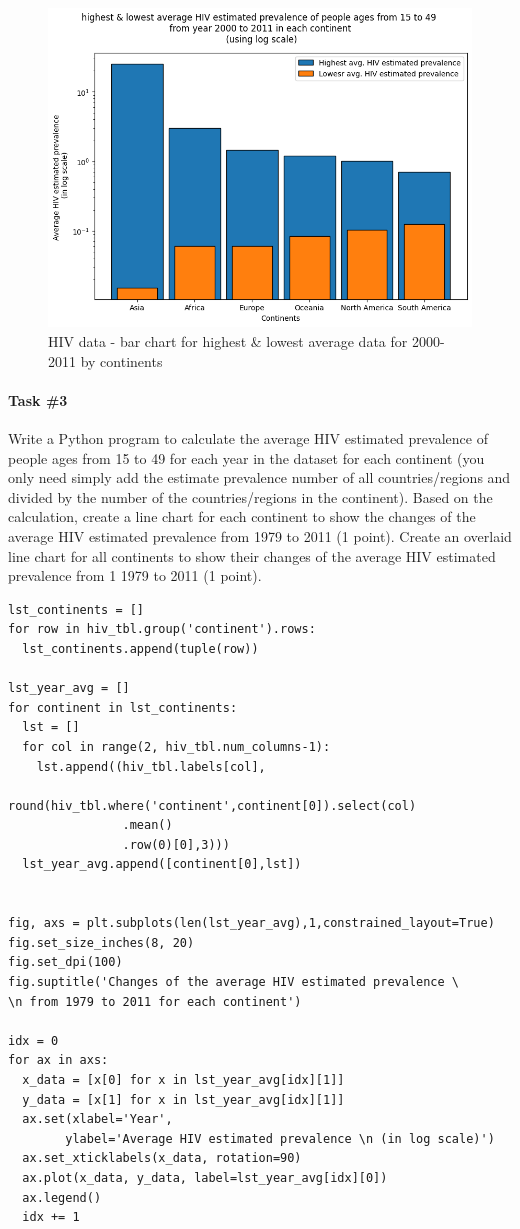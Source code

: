 \documentclass[UTF8, letter]{article}
\begin{document}
\begin{figure}[h!]
	\centering
	\includegraphics[width=0.9\linewidth]{output_10.png}
	\caption{HIV data - bar chart for highest \& lowest average data for 2000-2011 by continents}
	\label{fig:boat1}
\end{figure}

\pagebreak
\paragraph{Task \#3}
Write a Python program to calculate the average HIV estimated prevalence of people ages from 15 to 49 for each year in the dataset for each continent (you only need simply add the estimate prevalence number of all countries/regions and divided by the number of the countries/regions in the continent). Based on the calculation, create a line chart for each continent to show the changes of the average HIV estimated prevalence from 1979 to 2011 (1 point). Create an overlaid line chart for all continents to show their changes of the average HIV estimated prevalence from 1 1979 to 2011 (1 point).

\begin{codeblock}
\begin{verbatim}
lst_continents = []
for row in hiv_tbl.group('continent').rows:
  lst_continents.append(tuple(row))

lst_year_avg = []
for continent in lst_continents:
  lst = []
  for col in range(2, hiv_tbl.num_columns-1):
    lst.append((hiv_tbl.labels[col], 
                round(hiv_tbl.where('continent',continent[0]).select(col)
                .mean()
                .row(0)[0],3)))
  lst_year_avg.append([continent[0],lst])


fig, axs = plt.subplots(len(lst_year_avg),1,constrained_layout=True)
fig.set_size_inches(8, 20)
fig.set_dpi(100)
fig.suptitle('Changes of the average HIV estimated prevalence \
\n from 1979 to 2011 for each continent')

idx = 0
for ax in axs:
  x_data = [x[0] for x in lst_year_avg[idx][1]]
  y_data = [x[1] for x in lst_year_avg[idx][1]]
  ax.set(xlabel='Year', 
        ylabel='Average HIV estimated prevalence \n (in log scale)')
  ax.set_xticklabels(x_data, rotation=90)
  ax.plot(x_data, y_data, label=lst_year_avg[idx][0])
  ax.legend()
  idx += 1
\end{verbatim}
\end{codeblock}
\end{document}
